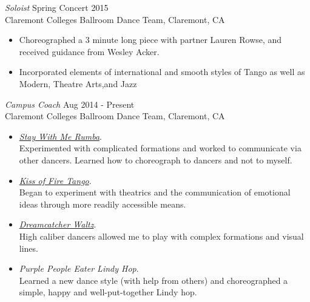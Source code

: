 {\sl Soloist} \hfill Spring Concert 2015 \\
Claremont Colleges Ballroom Dance Team, Claremont, CA
\begin{itemize} \itemsep -2pt
  \item Choreographed a 3 minute long piece with partner Lauren
  Rowse, and received guidance from Wesley Acker.
  \item Incorporated elements of international and smooth styles  of Tango as well as Modern, Theatre Arts,and Jazz
\end{itemize}


{\sl Campus Coach} \hfill Aug 2014 - Present \\
Claremont Colleges Ballroom Dance Team, Claremont, CA
\begin{itemize}
  \item \textit{\href{https://drive.google.com/file/d/0B2WsbhVvHJJyYnYtLXNPUWNXUk0/view?usp=sharing}{Stay With Me Rumba}}.\\
   Experimented with
  complicated formations and worked to communicate via other
  dancers. Learned how to choreograph to dancers and not to
  myself.
  \item \textit{\href{https://plus.google.com/photos/+MaxKukartsev/albums/6144495094776534145/6144495097770215842?authkey=CO2G7Y2i9fjypgE&pid=6144495097770215842&oid=115740325087461775740}{Kiss of Fire Tango}}.\\
  Began to experiment with theatrics and the communication of emotional ideas through more readily accessible means.
  \item \textit{\href{https://www.youtube.com/watch?v=iACqVU0UqRM&list=PLicWyjcK6YEtu1ffM4Em57XPo1SEu_iyo&index=1}{Dreamcatcher Waltz}}.\\
  High caliber dancers allowed
  me to play with complex formations and visual lines.
  \item \textit{Purple People Eater Lindy Hop}. \\
  Learned a new dance style (with help from others) and choreographed a simple,
  happy and well-put-together Lindy hop.
\end{itemize}
